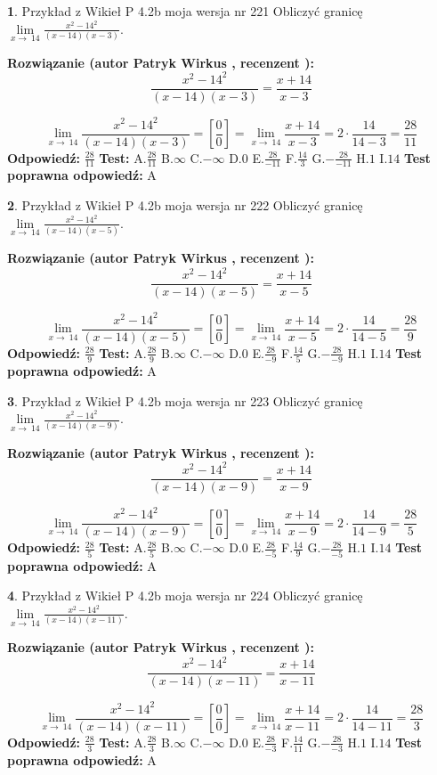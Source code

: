 \documentclass[12pt, a4paper]{article}
\theoremstyle{definition} %
\newtheorem{zad}{}
\newcommand{\zadStart}[1]{\begin{zad}#1\newline}
\newcommand{\zadStop}{\end{zad}}
\newcommand{\rozwStart}[2]{\noindent \textbf{Rozwiązanie (autor #1 , recenzent #2): }\newline}
\newcommand{\rozwStop}{\newline}
\newcommand{\odpStart}{\noindent \textbf{Odpowiedź:}\newline}
\newcommand{\odpStop}{\newline}
\newcommand{\testStart}{\noindent \textbf{Test:}\newline}
\newcommand{\testStop}{\newline}
\newcommand{\kluczStart}{\noindent \textbf{Test poprawna odpowiedź:}\newline}
\newcommand{\kluczStop}{\newline}
\begin{document}
\zadStart{Przykład z Wikieł P 4.2b moja wersja nr 221}
Obliczyć granicę $\lim\limits_{x\to\ 14}\frac{x^{2}-14^{2}}{(x-14)(x-3)}$.
\zadStop
\rozwStart{Patryk Wirkus}{}
$$\frac{x^{2}-14^{2}}{(x-14)(x-3)}=\frac{x+14}{x-3}$$

$$\lim\limits_{x\to\ 14}\frac{x^{2}-14^{2}}{(x-14)(x-3)}=[\frac{0}{0}]=\lim\limits_{x\to\ 14}\frac{x+14}{x-3}=2 \cdot \frac{14}{14-3} = \frac{28}{11}$$
\rozwStop
\odpStart
$\frac{28}{11}$
\odpStop
\testStart
A.$\frac{28}{11}$
B.$\infty$
C.$-\infty$
D.$0$
E.$\frac{28}{-11}$
F.$\frac{14}{3}$
G.$-\frac{28}{-11}$
H.$1$
I.$14$
\testStop
\kluczStart
A
\kluczStop



\zadStart{Przykład z Wikieł P 4.2b moja wersja nr 222}
Obliczyć granicę $\lim\limits_{x\to\ 14}\frac{x^{2}-14^{2}}{(x-14)(x-5)}$.
\zadStop
\rozwStart{Patryk Wirkus}{}
$$\frac{x^{2}-14^{2}}{(x-14)(x-5)}=\frac{x+14}{x-5}$$

$$\lim\limits_{x\to\ 14}\frac{x^{2}-14^{2}}{(x-14)(x-5)}=[\frac{0}{0}]=\lim\limits_{x\to\ 14}\frac{x+14}{x-5}=2 \cdot \frac{14}{14-5} = \frac{28}{9}$$
\rozwStop
\odpStart
$\frac{28}{9}$
\odpStop
\testStart
A.$\frac{28}{9}$
B.$\infty$
C.$-\infty$
D.$0$
E.$\frac{28}{-9}$
F.$\frac{14}{5}$
G.$-\frac{28}{-9}$
H.$1$
I.$14$
\testStop
\kluczStart
A
\kluczStop



\zadStart{Przykład z Wikieł P 4.2b moja wersja nr 223}
Obliczyć granicę $\lim\limits_{x\to\ 14}\frac{x^{2}-14^{2}}{(x-14)(x-9)}$.
\zadStop
\rozwStart{Patryk Wirkus}{}
$$\frac{x^{2}-14^{2}}{(x-14)(x-9)}=\frac{x+14}{x-9}$$

$$\lim\limits_{x\to\ 14}\frac{x^{2}-14^{2}}{(x-14)(x-9)}=[\frac{0}{0}]=\lim\limits_{x\to\ 14}\frac{x+14}{x-9}=2 \cdot \frac{14}{14-9} = \frac{28}{5}$$
\rozwStop
\odpStart
$\frac{28}{5}$
\odpStop
\testStart
A.$\frac{28}{5}$
B.$\infty$
C.$-\infty$
D.$0$
E.$\frac{28}{-5}$
F.$\frac{14}{9}$
G.$-\frac{28}{-5}$
H.$1$
I.$14$
\testStop
\kluczStart
A
\kluczStop



\zadStart{Przykład z Wikieł P 4.2b moja wersja nr 224}
Obliczyć granicę $\lim\limits_{x\to\ 14}\frac{x^{2}-14^{2}}{(x-14)(x-11)}$.
\zadStop
\rozwStart{Patryk Wirkus}{}
$$\frac{x^{2}-14^{2}}{(x-14)(x-11)}=\frac{x+14}{x-11}$$

$$\lim\limits_{x\to\ 14}\frac{x^{2}-14^{2}}{(x-14)(x-11)}=[\frac{0}{0}]=\lim\limits_{x\to\ 14}\frac{x+14}{x-11}=2 \cdot \frac{14}{14-11} = \frac{28}{3}$$
\rozwStop
\odpStart
$\frac{28}{3}$
\odpStop
\testStart
A.$\frac{28}{3}$
B.$\infty$
C.$-\infty$
D.$0$
E.$\frac{28}{-3}$
F.$\frac{14}{11}$
G.$-\frac{28}{-3}$
H.$1$
I.$14$
\testStop
\kluczStart
A
\kluczStop
\end{document}
